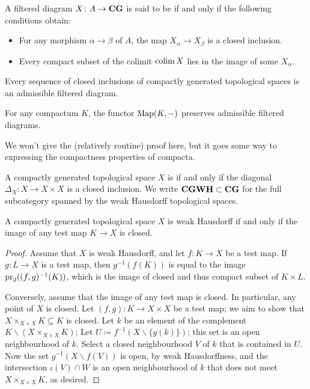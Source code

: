 \begin{dfn}
	A filtered diagram $ X \colon A \to \textbf{\textup{CG}} $ is said to be  if and only if the following conditions obtain:
	\begin{itemize}
		\item For any morphism $ \alpha \to \beta $ of $ A $, the map $ X_{\alpha} \to X_{\beta} $ is a closed inclusion.
		\item Every compact subset of the colimit $ \operatorname*{colim} X $ lies in the image of some $ X_{\alpha} $.
	\end{itemize}
\end{dfn}

\begin{exm}
	Every sequence of closed inclusions of compactly generated topological spaces is an admissible filtered diagram.
\end{exm}

\begin{lem}
	For any compactum $ K $, the functor $ \operatorname{Map}(K, -) $ preserves admissible filtered diagrams.
\end{lem}

We won't give the (relatively routine) proof here, but it goes some way to expressing the compactness properties of compacta.

\begin{dfn}
	A compactly generated topological space $ X $ is  if and only if the diagonal $ \Delta_X \colon X \to X \times X $ is a closed inclusion.
	We write $ \textbf{\textup{CGWH}} \subset \textbf{\textup{CG}} $ for the full subcategory spanned by the weak Hausdorff topological spaces.
\end{dfn}

\begin{lem}
	A compactly generated topological space $ X $ is weak Hausdorff if and only if the image of any test map $ K \to X $ is closed.
\end{lem}

\begin{proof}
	Assume that $ X $ is weak Hausdorff, and let $ f \colon K \to X $ be a test map.
	If $ g \colon L \to X $ is a test map, then $ g^{-1}(f(K)) $ is equal to the image $ \operatorname{pr}_2((f, g)^{-1}(K)) $, which is the image of closed and thus compact subset of $ K \times L $.

	Conversely, assume that the image of any test map is closed.
	In particular, any point of $ X $ is closed.
	Let $ (f, g) \colon K \to X \times X $ be a test map;
	we aim to show that $ X \times_{X \times X} K \subseteq K $ is closed.
	Let $ k $ be an element of the complement $ K \smallsetminus ( X \times_{X \times X} K ) $;
	Let $ U \coloneq f^{-1}( X \smallsetminus \{ g(k) \} ) $;
	this set is an open neighbourhood of $ k $.
	Select a closed neighbourhood $ V $ of $ k $ that is contained in $ U $.
	Now the set $ g^{-1}(X \smallsetminus f(V)) $ is open, by weak Hausdorffness, and the intersection $ \iota(V) \cap W $ is an open neighbourhood of $ k $ that does not meet $ X \times_{X \times X} K $, as desired.
\end{proof}

